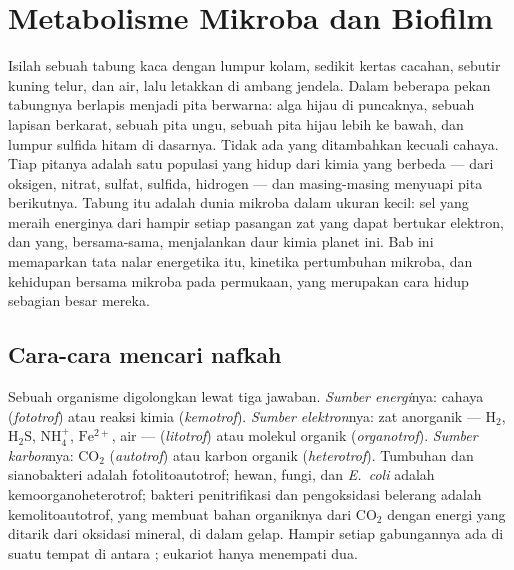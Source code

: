 \chapter{Metabolisme Mikroba dan Biofilm}\label{ch:b2:microbial-metabolism}

Isilah sebuah tabung kaca dengan lumpur kolam, sedikit kertas cacahan,
sebutir kuning telur, dan air, lalu letakkan di ambang jendela. Dalam
beberapa pekan tabungnya berlapis menjadi pita berwarna: alga hijau di
puncaknya, sebuah lapisan berkarat, sebuah pita ungu, sebuah pita hijau
lebih ke bawah, dan lumpur sulfida hitam di dasarnya. Tidak ada yang
ditambahkan kecuali cahaya. Tiap pitanya adalah satu populasi yang
hidup dari kimia yang berbeda --- dari oksigen, nitrat, sulfat,
sulfida, hidrogen --- dan masing-masing menyuapi pita berikutnya.
Tabung itu adalah dunia mikroba dalam ukuran kecil: sel yang meraih
energinya dari hampir setiap pasangan zat yang dapat bertukar elektron,
dan yang, bersama-sama, menjalankan daur kimia planet ini. Bab ini
memaparkan tata nalar energetika itu, kinetika pertumbuhan mikroba, dan
kehidupan bersama mikroba pada permukaan, yang merupakan cara hidup
sebagian besar mereka.

\section{Cara-cara mencari nafkah}

\begin{definition}\label{def:b2:microbial-metabolism:trophic}
Sebuah organisme digolongkan lewat tiga jawaban. \emph{Sumber
energi}nya: cahaya (\emph{fototrof}) atau reaksi kimia
(\emph{kemotrof}). \emph{Sumber elektron}nya: zat anorganik ---
$\mathrm{H_2}$, $\mathrm{H_2S}$, $\mathrm{NH_4^+}$,
$\mathrm{Fe^{2+}}$, air --- (\emph{litotrof}) atau molekul organik
(\emph{organotrof}). \emph{Sumber karbon}nya: $\mathrm{CO_2}$
(\emph{autotrof}) atau karbon organik (\emph{heterotrof}). Tumbuhan
dan sianobakteri adalah fotolitoautotrof; hewan, fungi, dan
\emph{E.~coli} adalah kemoorganoheterotrof; bakteri penitrifikasi dan
pengoksidasi belerang adalah kemolitoautotrof, yang membuat bahan
organiknya dari $\mathrm{CO_2}$ dengan energi yang ditarik dari
oksidasi mineral, di dalam gelap. Hampir setiap gabungannya ada di
suatu tempat di antara ; eukariot hanya menempati dua.
\end{definition}

